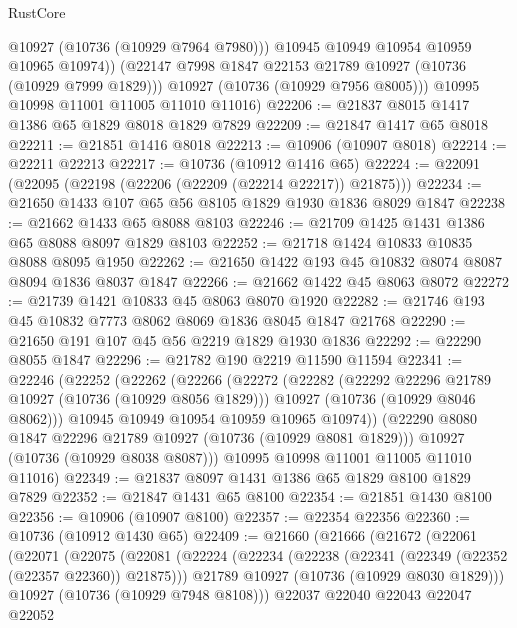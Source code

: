 \begin{lexlean}{RustCore}
\begin{coremodule}
              @10927
              (@10736 (@10929 @7964 @7980)))
            @10945
            @10949
            @10954
            @10959
            @10965
            @10974))
        (@22147 @7998 @1847 @22153 @21789 @10927 (@10736 (@10929 @7999 @1829)))
        @10927
        (@10736 (@10929 @7956 @8005)))
      @10995
      @10998
      @11001
      @11005
      @11010
      @11016)
@22206 := @21837 @8015 @1417 @1386 @65 @1829 @8018 @1829 @7829
@22209 := @21847 @1417 @65 @8018
@22211 := @21851 @1416 @8018
@22213 := @10906 (@10907 @8018)
@22214 := @22211 @22213
@22217 := @10736 (@10912 @1416 @65)
@22224 := @22091 (@22095 (@22198 (@22206 (@22209 (@22214 @22217)) @21875)))
@22234 := @21650 @1433 @107 @65 @56 @8105 @1829 @1930 @1836 @8029 @1847
@22238 := @21662 @1433 @65 @8088 @8103
@22246 := @21709 @1425 @1431 @1386 @65 @8088 @8097 @1829 @8103
@22252 := @21718 @1424 @10833 @10835 @8088 @8095 @1950
@22262 := @21650 @1422 @193 @45 @10832 @8074 @8087 @8094 @1836 @8037 @1847
@22266 := @21662 @1422 @45 @8063 @8072
@22272 := @21739 @1421 @10833 @45 @8063 @8070 @1920
@22282 := @21746 @193 @45 @10832 @7773 @8062 @8069 @1836 @8045 @1847 @21768
@22290 := @21650 @191 @107 @45 @56 @2219 @1829 @1930 @1836
@22292 := @22290 @8055 @1847
@22296 := @21782 @190 @2219 @11590 @11594
@22341 := @22246
    (@22252
      (@22262
        (@22266
          (@22272
            (@22282
              (@22292 @22296 @21789 @10927 (@10736 (@10929 @8056 @1829)))
              @10927
              (@10736 (@10929 @8046 @8062)))
            @10945
            @10949
            @10954
            @10959
            @10965
            @10974))
        (@22290 @8080 @1847 @22296 @21789 @10927 (@10736 (@10929 @8081 @1829)))
        @10927
        (@10736 (@10929 @8038 @8087)))
      @10995
      @10998
      @11001
      @11005
      @11010
      @11016)
@22349 := @21837 @8097 @1431 @1386 @65 @1829 @8100 @1829 @7829
@22352 := @21847 @1431 @65 @8100
@22354 := @21851 @1430 @8100
@22356 := @10906 (@10907 @8100)
@22357 := @22354 @22356
@22360 := @10736 (@10912 @1430 @65)
@22409 := @21660
    (@21666
      (@21672
        (@22061
          (@22071
            (@22075
              (@22081
                (@22224
                  (@22234
                    (@22238 (@22341 (@22349 (@22352 (@22357 @22360)) @21875)))
                    @21789
                    @10927
                    (@10736 (@10929 @8030 @1829)))
                  @10927
                  (@10736 (@10929 @7948 @8108)))
                @22037
                @22040
                @22043
                @22047
                @22052

\end{coremodule}
\end{lexlean}
